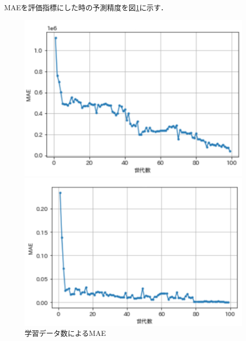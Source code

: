 \documentclass[main]{subfiles}
\begin{document}
    MAEを評価指標にした時の予測精度を図\ref{data_2}に示す．
    \begin{figure}
        \begin{minipage}[b]{0.45\linewidth}
          \centering
          \includegraphics[width=\linewidth]{figures/z_r.png}
        \end{minipage}
        \begin{minipage}[b]{0.45\linewidth}
          \centering
          \includegraphics[width=\linewidth]{figures/z_mae.png}
        \end{minipage}
        \caption{学習データ数によるMAE}
        \label{data_2}
      \end{figure}
\end{document}
